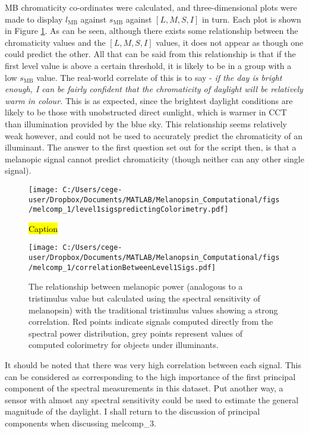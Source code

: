 \gls{MB} chromaticity co-ordinates were calculated, %
and three-dimensional plots were made to display $l_{\text{MB}}$ against $s_{\text{MB}}$ against $[L,M,S,I]$ in turn. Each plot is shown in Figure \ref{fig:l1}. As can be seen, although there exists some relationship between the chromaticity values and the $[L,M,S,I]$ values, it does not appear as though one could predict the other. All that can be said from this relationship is that if the first level value is above a certain threshold, it is likely to be in a group with a low $s_{\text{MB}}$ value. The real-world correlate of this is to say - \textit{if the day is bright enough, I can be fairly confident that the chromaticity of daylight will be relatively warm in colour.} This is as expected, since the brightest daylight conditions are likely to be those with unobstructed direct sunlight, which is warmer in \gls{CCT} %
than illumination provided by the blue sky. This relationship seems relatively weak however, and could not be used to accurately predict the chromaticity of an illuminant. The answer to the first question set out for the script then, is that a melanopic signal cannot predict chromaticity (though neither can any other single signal).

\begin{figure}[h]
    \centering
    \texttt{[image: C:/Users/cege-user/Dropbox/Documents/MATLAB/Melanopsin\_Computational/figs/melcomp\_1/level1sigspredictingColorimetry.pdf]}
    \caption{\hl{Caption}}
    \label{fig:l1}
\end{figure} 

\begin{figure}[h]
    \centering
    \texttt{[image: C:/Users/cege-user/Dropbox/Documents/MATLAB/Melanopsin\_Computational/figs/melcomp\_1/correlationBetweenLevel1Sigs.pdf]}
    \caption{The relationship between melanopic power (analogous to a tristimulus value but calculated using the spectral sensitivity of melanopsin) with the traditional tristimulus values showing a strong correlation. Red points indicate signals computed directly from the spectral power distribution, grey points represent values of computed colorimetry for objects under illuminants.}
    \label{fig:tristimCorrelation}
\end{figure} 

It should be noted that there was very high correlation between each signal. This can be considered as corresponding to the high importance of the first principal component of the spectral measurements in this dataset. Put another way, a sensor with almost any spectral sensitivity could be used to estimate the general magnitude of the daylight. I shall return to the discussion of principal components when discussing melcomp\_3.

